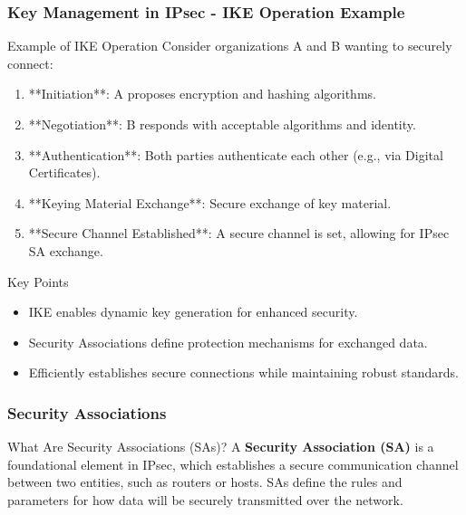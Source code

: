 \documentclass{beamer}
\begin{document}
\begin{frame}[fragile]
    \frametitle{Key Management in IPsec - IKE Operation Example}
    \begin{block}{Example of IKE Operation}
        Consider organizations A and B wanting to securely connect:
        \begin{enumerate}
            \item **Initiation**: A proposes encryption and hashing algorithms.
            \item **Negotiation**: B responds with acceptable algorithms and identity.
            \item **Authentication**: Both parties authenticate each other (e.g., via Digital Certificates).
            \item **Keying Material Exchange**: Secure exchange of key material.
            \item **Secure Channel Established**: A secure channel is set, allowing for IPsec SA exchange.
        \end{enumerate}
    \end{block}
    
    \begin{block}{Key Points}
        \begin{itemize}
            \item IKE enables dynamic key generation for enhanced security.
            \item Security Associations define protection mechanisms for exchanged data.
            \item Efficiently establishes secure connections while maintaining robust standards.
        \end{itemize}
    \end{block}
\end{frame}

\begin{frame}[fragile]
    \frametitle{Security Associations}
    \begin{block}{What Are Security Associations (SAs)?}
        A \textbf{Security Association (SA)} is a foundational element in IPsec, which establishes a secure communication channel between two entities, such as routers or hosts. 
        SAs define the rules and parameters for how data will be securely transmitted over the network.
    \end{block}
\end{frame}
\end{document}
